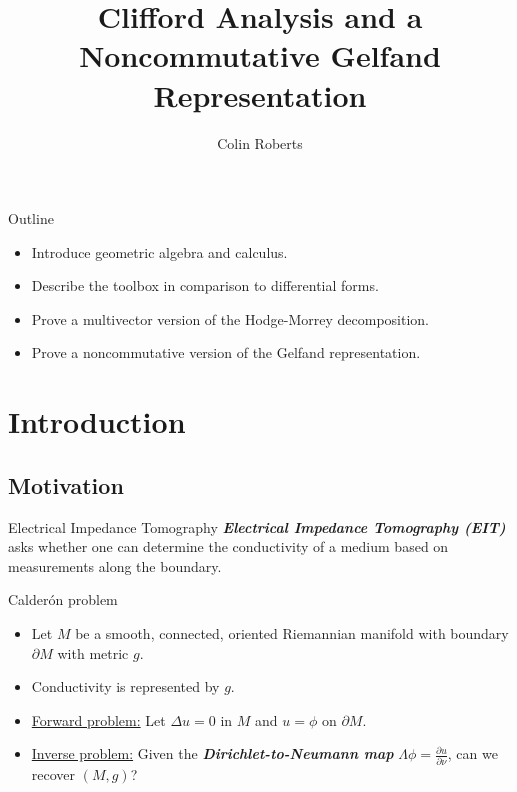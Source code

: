 \documentclass[aspectratio=169,handout]{beamer}
\author{Colin Roberts}
\title{Clifford Analysis and a Noncommutative Gelfand Representation}
\subtitle{}
\newcommand\boldgreen[1]{\textcolor{lighter_csu_green}{\emph{\textbf{#1}}}}
\begin{document}
\begin{frame}{Outline}
\vfill
    \begin{itemize}
    \pause
        \item Introduce geometric algebra and calculus.
        
        \pause
        \item Describe the toolbox in comparison to differential forms.
        
        \pause
        \item Prove a multivector version of the Hodge-Morrey decomposition.
        
        \pause
        \item Prove a noncommutative version of the Gelfand representation.
    \end{itemize}
\vfill    
\end{frame}

\section{Introduction}

\subsection{Motivation}
\begin{frame}{Electrical Impedance Tomography}
\vfill
\boldgreen{Electrical Impedance Tomography (EIT)} asks whether one can determine the conductivity of a medium based on measurements along the boundary.
\vfill
\end{frame}

\begin{frame}{Calder\'on problem}
\vfill 
    \begin{itemize}
        \pause 
        \item Let $M$ be a smooth, connected, oriented Riemannian manifold with boundary $\partial M$ with metric $g$.
        
        \pause
        \item Conductivity is represented by $g$.
        
        \pause
        \item \underline{Forward problem:} Let $\Delta u = 0$ in $M$ and $u=\phi$ on $\partial M$.
        
        \pause
        \item \underline{Inverse problem:} Given the \boldgreen{Dirichlet-to-Neumann map} $\Lambda \phi = \frac{\partial u}{\partial \nu}$, can we recover $(M,g)$?
    \end{itemize}
\vfill
\end{frame}
\end{document}
